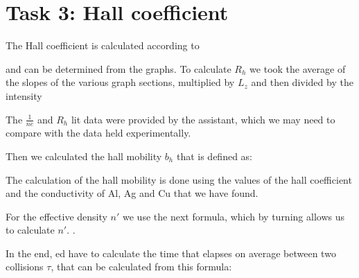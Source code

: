 \documentclass{article}
\begin{document}
\newpage

\section{Task 3: Hall coefficient}
The Hall coefficient is calculated according to

\noindent 
and can be determined from the graphs. To calculate $R_{h}$ we took the average of the slopes of the various graph sections, multiplied by $L_{z}$ and then divided by the intensity \par
The $\frac{1}{ne} $ and $R_{h}$ lit data were provided by the assistant, which we may need to compare with the data held experimentally.

Then we calculated the hall mobility $b_{h}$ that is defined as:

\noindent 
The calculation of the hall mobility is done using the values of the hall coefficient and the conductivity of Al, Ag and Cu that we have found.

For the effective density $n'$ we use the next formula, which by turning allows us to calculate $n'$.
.


In the end, ed have to calculate the time that elapses on average between two collisions $\tau$, that can be calculated from this formula:

\newpage
\end{document}
